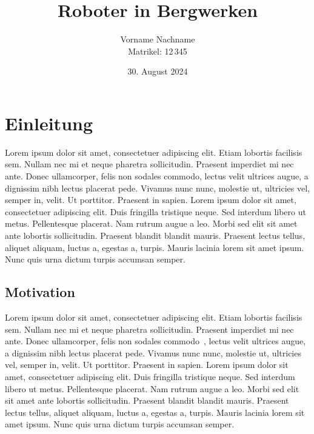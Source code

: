 \documentclass[footmark=none]{tubaf-thesis}
\title{Roboter in Bergwerken}
\author{Vorname Nachname\\{\small Matrikel: 12\,345}}
\date{30. August 2024}
\begin{document}

    \maketitle
    \makedeclarationofauthorship[30. August 2024]
    \tableofcontents
    
    \newpage
    \listoffigures 						%
    \newpage
    \listoftables 						%
    
    \clearpage
    
    \chapter{Einleitung}
    Lorem ipsum dolor sit amet, consectetuer adipiscing elit. Etiam lobortis facilisis sem.
    Nullam nec mi et neque pharetra sollicitudin. Praesent imperdiet mi nec ante. \cite{Losch2018} Donec
    ullamcorper, felis non sodales commodo, lectus velit ultrices augue, a dignissim nibh
    lectus placerat pede. Vivamus nunc nunc, molestie ut, ultricies vel, semper in, velit. Ut
    porttitor. Praesent in sapien. Lorem ipsum dolor sit amet, consectetuer adipiscing elit.
    Duis fringilla tristique neque. Sed interdum libero ut metus. Pellentesque placerat. Nam
    rutrum augue a leo. Morbi sed elit sit amet ante lobortis sollicitudin. Praesent blandit
    blandit mauris. Praesent lectus tellus, aliquet aliquam, luctus a, egestas a, turpis. Mauris
    lacinia lorem sit amet ipsum. Nunc quis urna dictum turpis accumsan semper.
    
    \section{Motivation}
    Lorem ipsum dolor sit amet, consectetuer adipiscing elit. Etiam lobortis facilisis sem.
    Nullam nec mi et neque pharetra sollicitudin. Praesent imperdiet mi nec ante. Donec
    ullamcorper, felis non sodales commodo~\cite{Guth2018}, lectus velit ultrices augue, a dignissim nibh
    lectus placerat pede. Vivamus nunc nunc, molestie ut, ultricies vel, semper in, velit. Ut
    porttitor. Praesent in sapien. Lorem ipsum dolor sit amet, consectetuer adipiscing elit.
    Duis fringilla tristique neque. Sed interdum libero ut metus. Pellentesque placerat. Nam
    rutrum augue a leo. Morbi sed elit sit amet ante lobortis sollicitudin. Praesent blandit
    blandit mauris. Praesent lectus tellus, aliquet aliquam, luctus a, egestas a, turpis. Mauris
    lacinia lorem sit amet ipsum. Nunc quis urna dictum turpis accumsan semper.
\end{document}
